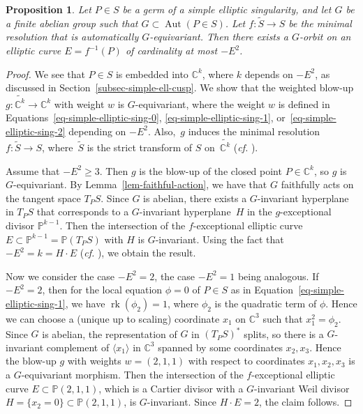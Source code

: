 \documentclass[11pt]{amsart}
\numberwithin{equation}{section}
\newtheorem{proposition}[thm]{Proposition}
\theoremstyle{definition}
\theoremstyle{remark}
\DeclareMathOperator{\Aut}{Aut}
\DeclareMathOperator{\rk}{rk}
\begin{document}
\begin{proposition}
\label{prop-small-orbit-on-elliptic-curve}
Let $P\in S$ be a germ of a simple elliptic singularity, and let $G$ be a finite abelian group such that $G\subset \Aut(P\in S)$.
Let $f\colon \widetilde{S}\to S$ be the minimal resolution that is automatically $G$-equivariant. 
Then there exists a $G$-orbit on an elliptic curve $E=f^{-1}(P)$ of cardinality at most $-E^2$. 
\end{proposition}

\begin{proof}
We see that $P\in S$ is embedded into $\mathbb{C}^k$, where $k$ depends on $-E^2$, as discussed in Section~\ref{subsec-simple-ell-cusp}. 
We show that the weighted blow-up $g\colon \widetilde{\mathbb{C}^k}\to \mathbb{C}^k$ with  weight $w$ is $G$-equivariant, where the weight $w$ is defined in Equations~\eqref{eq-simple-elliptic-sing-0}, \eqref{eq-simple-elliptic-sing-1}, or~\eqref{eq-simple-elliptic-sing-2} depending on $-E^2$. Also,~$g$ induces the minimal resolution $f\colon \widetilde{S}\to S$, where~$\widetilde{S}$ is the strict transform of $S$ on~$\widetilde{\mathbb{C}^k}$ (\textit{cf.} \cite[Theorem~4.57]{KM98}).

Assume that $-E^2\geq 3$. Then $g$ is the blow-up of the closed point $P\in \mathbb{C}^k$, so $g$ is $G$-equivariant. 
By Lemma~\ref{lem-faithful-action}, we have that $G$ faithfully acts on the tangent space $T_P S$. Since $G$ is abelian, there exists a $G$-invariant hyperplane in $T_P S$ that corresponds to a $G$-invariant hyperplane~$H$ in the $g$-exceptional divisor $\mathbb{P}^{k-1}$. 
Then the intersection of the $f$-exceptional elliptic curve $E\subset \mathbb{P}^{k-1}=\mathbb{P}(T_P S)$ with $H$ is $G$-invariant. Using the fact that 
$-E^2=k=H\cdot E$ (\textit{cf.} \cite[Proposition~4.54]{KM98}), we obtain the result.

Now we consider the case $-E^2=2$, the case $-E^2=1$ being analogous. If $-E^2=2$, then for the local equation $\phi=0$ of $P\in S$ as in Equation~\eqref{eq-simple-elliptic-sing-1}, we have $\rk(\phi_2)=1$, where $\phi_2$ is the quadratic term of $\phi$.  Hence we can choose a (unique up to scaling) coordinate $x_1$ on $\mathbb{C}^3$ such that $x_1^2=\phi_2$.  Since $G$ is abelian, the representation of $G$ in $(T_P S)^*$ splits, so there is a $G$-invariant complement of $\langle x_1 \rangle$ in $\mathbb{C}^3$ spanned by some coordinates $x_2, x_3$. Hence the blow-up $g$ with weights $w=(2,1,1)$ with respect to coordinates $x_1,x_2,x_3$ is a $G$-equivariant morphism. Then the intersection of the $f$-exceptional elliptic curve $E\subset \mathbb{P}(2,1,1)$, which is a Cartier divisor with a $G$-invariant Weil divisor $H=\{x_2=0\}\subset \mathbb{P}(2,1,1)$, is $G$-invariant. Since $H\cdot E=2$, the claim follows.
\end{proof}
\end{document}
